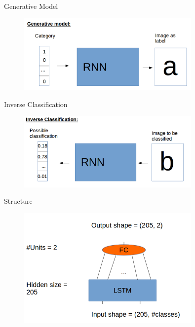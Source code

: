 \documentclass[compress]{beamer}
\begin{document}
	\subsection{ } %
	\begin{frame}{Generative Model}
		\begin{figure}
			\centering
			\includegraphics[width=0.8\textwidth]{images/generative_model.png}
		\end{figure}
	\end{frame}
	\begin{frame}{Inverse Classification}
		\begin{figure}
			\centering
			\includegraphics[width=0.8\textwidth]{images/inverse_classification.png}
		\end{figure}
	\end{frame}
	\begin{frame}{Structure}
		\begin{figure}
			\centering
			\includegraphics[width=0.8\textwidth]{images/generative_model_details.png}
		\end{figure}
	\end{frame}
\end{document}
